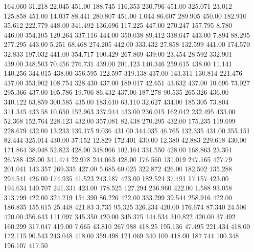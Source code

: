  164.060   31.218   22.045       451.00
 188.745  116.353  230.796       451.00
 325.071   23.012  125.858       451.00
  14.037   88.441  280.807       451.00
   1.044   86.607  289.905       450.00
 182.910   35.612  222.779       448.00
 341.492  136.696  117.225       447.00
 270.247  157.795    8.780       446.00
 354.105  129.264  337.116       444.00
 350.038   89.412  338.647       443.00
   7.894   88.295  277.295       443.00
   5.251   68.468  274.205       442.00
 333.432   27.858  132.599       441.00
 174.570   32.833  197.032       441.00
 354.717  100.429  267.869       439.00
  23.454   28.592  332.901       439.00
 348.503   70.456  276.731       439.00
 201.123  140.346  259.615       438.00
  11.141  140.256  344.015       438.00
 356.595  122.597  319.138       437.00
 143.311  130.814  221.476       437.00
 353.902  108.754  328.430       437.00
 189.017   42.651   43.632       437.00
  10.696   73.027  295.366       437.00
 105.786   19.706   86.432       437.00
 187.278   90.535  265.326       436.00
 340.122   63.859  300.585       435.00
 183.610   63.110   32.627       434.00
 185.305   73.804  311.345       433.58
  10.650  152.963  337.944       433.00
 236.015  162.042  232.495       433.00
  52.368  152.764  228.123       432.00
 357.081   82.438  270.295       432.00
 175.235  119.699  228.679       432.00
  13.233  139.175    9.036       431.00
 344.035   46.765  132.335       431.00
 355.151   82.444  325.014       430.00
  37.152   12.829  172.401       430.00
  12.380   42.883  229.618       430.00
 171.864   38.048   52.823       428.00
 348.966  102.164  331.550       428.00
 168.863   23.301   26.788       428.00
 341.474   22.978  244.063       428.00
 176.560  131.019  247.165       427.79
 201.041  143.357  269.335       427.00
   5.685   60.025  322.872       426.00
 182.502  135.288  294.541       426.00
 174.935   41.523  243.187       423.00
 182.524   37.491   17.157       423.00
 194.634  140.707  241.331       423.00
 178.525  127.294  236.960       422.00
   1.588   93.058  313.799       422.00
 324.219  154.390   86.226       422.00
 333.299   39.544  258.916       422.00
 186.835  155.615   25.448       421.83
   3.735   95.325  326.234       420.00
 176.674   87.340   24.506       420.00
 356.643  111.097  345.350       420.00
 345.375  144.534  310.822       420.00
  37.492  160.299  317.047       419.00
   7.665   43.810  267.988       418.25
 195.136   47.495  221.434       418.00
 172.115   90.543  243.048       418.00
 359.498  121.069  340.109       418.00
 187.744  100.348  196.107       417.50
